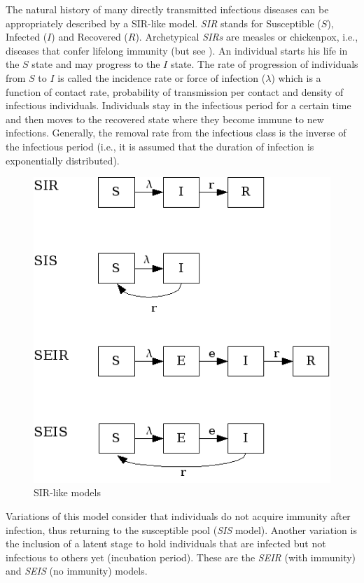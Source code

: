 The natural history of many directly transmitted infectious diseases can be appropriately described by a SIR-like model. \textit{SIR} stands for Susceptible ($S$), Infected ($I$) and Recovered ($R$). Archetypical \textit{SIRs} are measles or chickenpox, i.e., diseases that confer lifelong immunity (but see \cite{KGlassandBTGrenfell2004}). An individual starts his life in the $S$ state and may progress to the $I$ state. The rate of progression of individuals from $S$ to $I$ is called the incidence rate or force of infection ($\lambda$) which is a function of contact rate, probability of transmission per contact and density of infectious individuals. Individuals stay in the infectious period for a certain time and then moves to the recovered state where they become immune to new infections. Generally, the removal rate from the infectious class is the inverse of the infectious period (i.e., it is assumed that the duration of infection is exponentially distributed).   

\begin{figure}
\begin{center}
\includegraphics[scale=0.8]{SIRdiagram.png}
\caption{SIR-like models}
\label{fig:sir}
\end{center}
\end{figure}

Variations of this model consider that individuals do not acquire immunity after infection, thus returning to the susceptible pool (\textit{SIS} model). Another variation is the inclusion of a latent stage to hold individuals that are infected but not infectious to others yet (incubation period). These are the \textit{SEIR} (with immunity) and \textit{SEIS} (no immunity) models.

